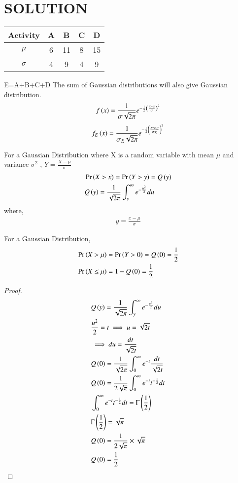 \documentclass[journal,12pt,twocolumn]{IEEEtran}
\begin{document}
\section{SOLUTION}
\begin{table}[h!]
\centering
\begin{tabular}{|c||c|c|c|c|}
    \hline
    Activity & A& B& C& D \\
    \hline
    $\mu$ & 6& 11& 8& 15\\[1ex]
    \hline
   $\sigma$ & 4& 9& 4& 9\\[1ex]
    \hline
\end{tabular}
\end{table}
E=A+B+C+D
The sum of Gaussian distributions will also give Gaussian distribution.
\begin{align}
f\left(x\right)=\frac{1}{\sigma\sqrt{2\pi}}e^{-\frac{1}{2}\left(\frac{x-\mu}{\sigma}\right)^2}
\end{align}
\begin{align}
f_E\left(x\right)=\frac{1}{\sigma_E\sqrt{2\pi}}e^{-\frac{1}{2}\left(\frac{x-\mu_E}{\sigma_E}\right)^2}
\end{align}
\begin{definition}
For a Gaussian Distribution where X is a random variable with mean $\mu$ and variance $\sigma^2$ , $Y=\frac{X-\mu}{\sigma}$
\begin{align}
&\Pr\left(X>x\right)=\Pr\left(Y>y\right)=Q\left(y\right)\\
&Q\left(y\right)=\frac{1}{\sqrt{2\pi}}\int_{y}^{\infty}e^{-\frac{u^2}{2}}du
\end{align}
where,
\begin{align*}
y=\frac{x-\mu}{\sigma}
\end{align*}
\end{definition}
\begin{lemma}\label{Q(0)=0.5}
For a Gaussian Distribution,
\begin{align}
&\Pr\left(X>\mu\right)=\Pr\left(Y>0\right)=Q\left(0\right)=\frac{1}{2}\\
&\Pr\left(X\leq \mu\right)=1-Q\left(0\right)=\frac{1}{2}
\end{align}
\end{lemma}
\begin{proof}
\begin{align}
&Q\left(y\right)=\frac{1}{\sqrt{2\pi}}\int_{y}^{\infty}e^{-\frac{u^2}{2}}du\\
&\frac{u^2}{2}=t\implies u=\sqrt{2t}\\
&\implies du=\frac{dt}{\sqrt{2t}}\\
&Q\left(0\right)=\frac{1}{\sqrt{2\pi}}\int_{0}^{\infty}e^{-t}\frac{dt}{\sqrt{2t}}\\
&Q\left(0\right)=\frac{1}{2\sqrt{\pi}}\int_{0}^{\infty}e^{-t} t^{-\frac{1}{2}} dt\\
&\int_{0}^{\infty}e^{-t} t^{-\frac{1}{2}} dt=\Gamma\left(\frac{1}{2}\right)\\
&\Gamma\left(\frac{1}{2}\right)=\sqrt{\pi}\\
&Q\left(0\right)=\frac{1}{2\sqrt{\pi}}\times \sqrt{\pi}\\
&Q\left(0\right)=\frac{1}{2}
\end{align}
\end{proof}
\end{document}
